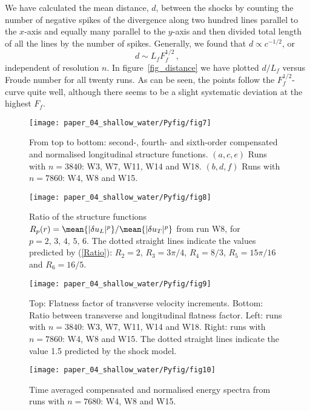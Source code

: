We have calculated  the mean distance, $ d $, between the shocks by counting the number of negative spikes
of the divergence along two hundred lines parallel to the $ x $-axis and equally many
parallel to the $ y $-axis and then divided total length of all the lines by
the number of spikes. Generally, we found that $ d \propto c^{-1/2} $, or
\begin{equation} \label{MeanDistance}
d \sim L_f F_f ^{1/2} \, ,
\end{equation}
independent of resolution $ n $. In figure~\ref{fig_distance} we have plotted
$ d/L_f $ versus Froude number for all twenty runs. As can be seen, the points
follow the $ F_f^{1/2} $-curve quite well, although there seems to be a slight
systematic deviation at the highest $ F_f $.

\begin{figure}[htp!]
\centerline{
\texttt{[image: paper\_04\_shallow\_water/Pyfig/fig7]}}
\caption{From top to bottom: second-, fourth- and sixth-order compensated and
    normalised longitudinal structure functions. $(a,c,e)$ Runs with $ n=3840 $: W3,
W7, W11, W14 and W18. $(b,d,f)$ Runs with $ n = 7860 $: W4, W8 and W15. }
\label{fig_StrucFunc}
\end{figure}

\begin{figure}
\centerline{\texttt{[image: paper\_04\_shallow\_water/Pyfig/fig8]}}
\caption{
Ratio of the structure functions
$R_p(r) = \mean{|\delta u_L|^p} / \mean{|\delta u_T|^p}$ from run W8,
for $ p = 2, \, 3, \, 4, \, 5, \, 6. $
The dotted straight lines indicate the values predicted by (\ref{Ratio}):
$R_2 = 2$, $R_3 = 3\pi/4$,  $R_4 = 8/3$, $ R_5 = 15 \pi /16 $ and $ R_6 = 16/5 $.}
\label{fig_ratio}
\end{figure}

\begin{figure}
\centerline{\texttt{[image: paper\_04\_shallow\_water/Pyfig/fig9]}}
\caption{ Top: Flatness factor of transverse velocity increments. Bottom: Ratio between transverse and longitudinal flatness factor. Left: runs with $ n=3840 $: W3,
W7, W11,  W14 and W18. Right: runs with $ n = 7860 $: W4, W8 and W15.  The dotted straight lines indicate the value 1.5 predicted by the shock model.  }
\label{fig_flatness}
\end{figure}

\begin{figure}
\centerline{\texttt{[image: paper\_04\_shallow\_water/Pyfig/fig10]}}
\caption{Time averaged compensated and normalised energy spectra
from runs with $ n = 7680 $: W4, W8 and W15.}
\label{fig_spectra_c40}
\end{figure}

